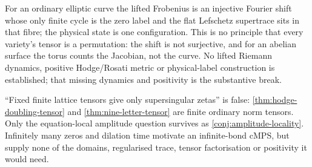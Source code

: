 \begin{observation}
\label{obs:toral-contribution}
For an ordinary elliptic curve the lifted Frobenius is an injective Fourier shift whose only
finite cycle is the zero label and the flat Lefschetz supertrace sits in that fibre; the
physical state is one configuration. This is no principle that every variety's tensor is a
permutation: the shift is not surjective, and for an abelian surface the torus counts the
Jacobian, not the curve. No lifted Riemann dynamics, positive Hodge/Rosati metric or
physical-label construction is established; that missing dynamics and positivity is the
substantive break.
\end{observation}

\begin{observation}
\label{obs:locality-dichotomy-restricted}
``Fixed finite lattice tensors give only supersingular zetas'' is false: \cref{thm:hodge-doubling-tensor}
and \cref{thm:nine-letter-tensor} are finite ordinary norm tensors. Only the equation-local
amplitude question survives as \cref{conj:amplitude-locality}. Infinitely many zeros and
dilation time motivate an infinite-bond cMPS, but supply none of the domains, regularised
trace, tensor factorisation or positivity it would need.
\end{observation}
